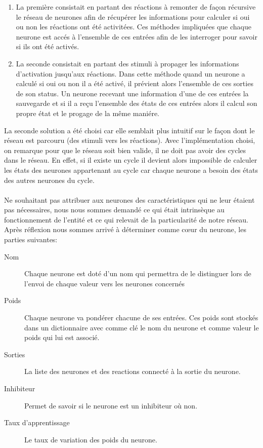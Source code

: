 \begin{enumerate}
  \item La première consistait en partant des réactions à remonter de façon
    récursive le réseau de neurones afin de récupérer les informations pour
    calculer si oui ou non les réactions ont été activitées. Ces méthodes impliquées
    que chaque neurone est accés à l'ensemble de ces entrées afin de les
    interroger pour savoir si ils ont été activés.
  \item La seconde consistait en partant des stimuli à propager les informations
    d'activation jusqu'aux réactions. Dans cette méthode quand un neurone a calculé
    si oui ou non il a été activé, il prévient alors l'ensemble de ces sorties de
    son status. Un neurone recevant une information d'une de ces entrées la
    sauvegarde et si il a reçu l'ensemble des états de ces entrées alors il calcul
    son propre état et le progage de la même maniére.
\end{enumerate}

La seconde solution a été choisi car elle semblait plus intuitif sur le
façon dont le réseau est parcouru (des stimuli vers les réactions). Avec
l'implémentation choisi, on remarque pour que le réseau soit bien valide,
il ne doit pas avoir des cycles dans le réseau. En effet, si il existe un
cycle il devient alors impossible de calculer les états des neurones
appartenant au cycle car chaque neurone a besoin des états des autres neurones du
cycle.

\paragraph{}
Ne souhaitant pas attribuer aux neurones des caractéristiques qui ne leur étaient
pas nécessaires, nous nous sommes demandé ce qui était intrinsèque au
fonctionnement de l'entité et ce qui relevait de la particularité de notre
réseau. Après réflexion nous sommes arrivé à déterminer comme cœur du neurone, les
parties suivantes:\\

\begin{description}
  \item[Nom] Chaque neurone est doté d'un nom qui permettra de le distinguer
    lors de l'envoi de chaque valeur vers les neurones concernés
  \item[Poids] Chaque neurone va pondérer chacune de ses entrées. Ces poids
    sont stockés dans un dictionnaire avec comme clé le nom du neurone et
    comme valeur le poids qui lui est associé.
  \item[Sorties] La liste des neurones et des reactions connecté à la sortie
    du neurone.
  \item[Inhibiteur] Permet de savoir si le neurone est un inhibiteur où non.
  \item[Taux d'apprentissage] Le taux de variation des poids du neurone.
\end{description}

\paragraph{}


